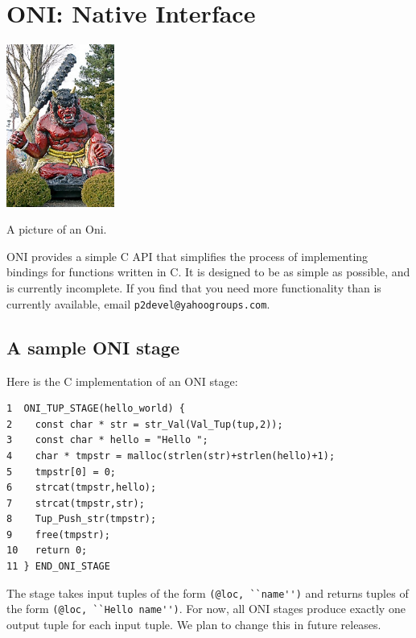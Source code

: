 \documentclass{article}
\begin{document}
\section{ONI: \ol Native Interface}

\begin{center}
%
%
%
%
\includegraphics[width=1.4in]{Oni.jpg}

A picture of an Oni.
\end{center}
ONI provides a simple C API that simplifies the process of
implementing \ol bindings for functions written in C.  It is
designed to be as simple as possible, and is currently incomplete.  If
you find that you need more functionality than is currently available,
email {\tt p2devel@yahoogroups.com}.

\subsection{A sample ONI stage}

Here is the C implementation of an ONI stage:
\begin{verbatim}
1  ONI_TUP_STAGE(hello_world) {
2    const char * str = str_Val(Val_Tup(tup,2));
3    const char * hello = "Hello ";
4    char * tmpstr = malloc(strlen(str)+strlen(hello)+1);
5    tmpstr[0] = 0;
6    strcat(tmpstr,hello);
7    strcat(tmpstr,str);
8    Tup_Push_str(tmpstr);
9    free(tmpstr);
10   return 0;
11 } END_ONI_STAGE
\end{verbatim}
The stage takes input tuples of the form \lstinline$(@loc, ``name'')$
and returns tuples of the form \lstinline$(@loc, ``Hello name'')$.
For now, all ONI stages produce exactly one output tuple for each
input tuple.  We plan to change this in future releases.
\end{document}
